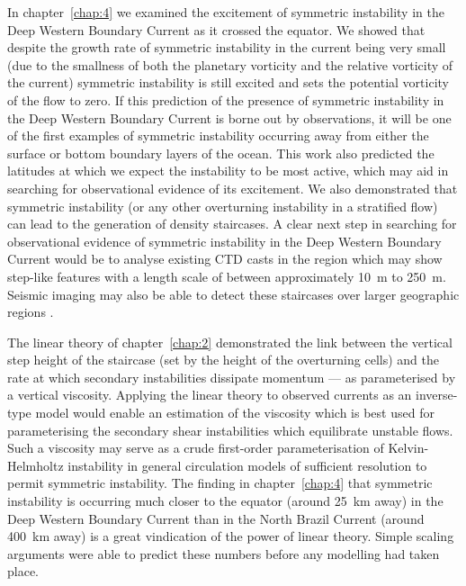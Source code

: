 In chapter~\ref{chap:4} we examined the excitement of symmetric instability in the Deep Western Boundary Current as it crossed the equator. We showed that despite the growth rate of symmetric instability in the current being very small (due to the smallness of both the planetary vorticity and the relative vorticity of the current) symmetric instability is still excited and sets the potential vorticity of the flow to zero. If this prediction of the presence of symmetric instability in the Deep Western Boundary Current is borne out by observations, it will be one of the first examples of symmetric instability occurring away from either the surface or bottom boundary layers of the ocean. This work also predicted the latitudes at which we expect the instability to be most active, which may aid in searching for observational evidence of its excitement. We also demonstrated that symmetric instability (or any other overturning instability in a stratified flow) can lead to the generation of density staircases. A clear next step in searching for observational evidence of symmetric instability in the Deep Western Boundary Current would be to analyse existing CTD casts in the region which may show step-like features with a length scale of between approximately 10~m to 250~m. Seismic imaging may also be able to detect these staircases over larger geographic regions \citep[e.g.][]{Fer2010}.

The linear theory of chapter~\ref{chap:2} demonstrated the link between the vertical step height of the staircase (set by the height of the overturning cells) and the rate at which secondary instabilities dissipate momentum --- as parameterised by a vertical viscosity. Applying the linear theory to observed currents as an inverse-type model would enable an estimation of the viscosity which is best used for parameterising the secondary shear instabilities which equilibrate unstable flows. Such a viscosity may serve as a crude first-order parameterisation of Kelvin-Helmholtz instability in general circulation models of sufficient resolution to permit symmetric instability. The finding in chapter~\ref{chap:4} that symmetric instability is occurring much closer to the equator (around 25~km away) in the Deep Western Boundary Current than in the North Brazil Current (around 400~km away) is a great vindication of the power of linear theory. Simple scaling arguments were able to predict these numbers before any modelling had taken place.

